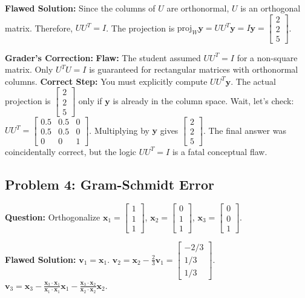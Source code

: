\documentclass[11pt, letterpaper]{article}
\theoremstyle{definition}
\theoremstyle{remark}
\begin{document}
\textbf{Flawed Solution:}
Since the columns of $U$ are orthonormal, $U$ is an orthogonal matrix. Therefore, $U U^T = I$.
The projection is $\text{proj}_W \mathbf{y} = U U^T \mathbf{y} = I \mathbf{y} = \begin{bmatrix} 2 \\ 2 \\ 5 \end{bmatrix}$.

\textbf{Grader's Correction:}
\textbf{Flaw:} The student assumed $U U^T = I$ for a non-square matrix. Only $U^T U = I$ is guaranteed for rectangular matrices with orthonormal columns.
\textbf{Correct Step:} You must explicitly compute $U U^T \mathbf{y}$. The actual projection is $\begin{bmatrix} 2 \\ 2 \\ 5 \end{bmatrix}$ only if $\mathbf{y}$ is already in the column space. Wait, let's check: $U U^T = \begin{bmatrix} 0.5 & 0.5 & 0 \\ 0.5 & 0.5 & 0 \\ 0 & 0 & 1 \end{bmatrix}$. Multiplying by $\mathbf{y}$ gives $\begin{bmatrix} 2 \\ 2 \\ 5 \end{bmatrix}$. The final answer was coincidentally correct, but the logic $U U^T = I$ is a fatal conceptual flaw.

\subsection{Problem 4: Gram-Schmidt Error}
\textbf{Question:} Orthogonalize $\mathbf{x}_1 = \begin{bmatrix} 1 \\ 1 \\ 1 \end{bmatrix}$, $\mathbf{x}_2 = \begin{bmatrix} 0 \\ 1 \\ 1 \end{bmatrix}$, $\mathbf{x}_3 = \begin{bmatrix} 0 \\ 0 \\ 1 \end{bmatrix}$.

\textbf{Flawed Solution:}
$\mathbf{v}_1 = \mathbf{x}_1$.
$\mathbf{v}_2 = \mathbf{x}_2 - \frac{2}{3}\mathbf{v}_1 = \begin{bmatrix} -2/3 \\ 1/3 \\ 1/3 \end{bmatrix}$.
$\mathbf{v}_3 = \mathbf{x}_3 - \frac{\mathbf{x}_3 \cdot \mathbf{x}_1}{\mathbf{x}_1 \cdot \mathbf{x}_1}\mathbf{x}_1 - \frac{\mathbf{x}_3 \cdot \mathbf{x}_2}{\mathbf{x}_2 \cdot \mathbf{x}_2}\mathbf{x}_2$.
\end{document}
